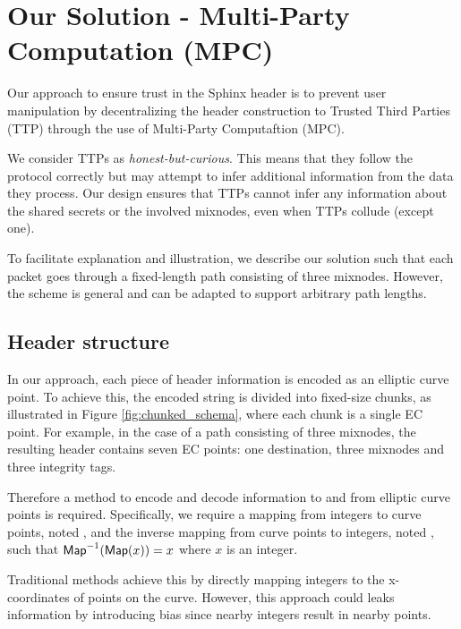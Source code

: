 \section{Our Solution - Multi-Party Computation (MPC)}\label{sec:scheme}

Our approach to ensure trust in the Sphinx header is to prevent user manipulation by decentralizing the header construction to Trusted Third Parties (TTP) through the use of Multi-Party Computaftion (MPC).
\newline

We consider TTPs as \textit{honest-but-curious}.
This means that they follow the protocol correctly but may attempt to infer additional information from the data they process.
Our design ensures that TTPs cannot infer any information about the shared secrets  or the involved mixnodes, even when TTPs collude (except one).
\newline

To facilitate explanation and illustration, we describe our solution such that each packet goes through a fixed-length path consisting of three mixnodes.
However, the scheme is general and can be adapted to support arbitrary path lengths. 


\subsection{Header structure}

In our approach, each piece of header information is encoded as an elliptic curve point. 
To achieve this, the encoded string is divided into fixed-size chunks, as illustrated in Figure \ref{fig:chunked_schema}, where each chunk is a single EC point. 
For example, in the case of a path consisting of three mixnodes, the resulting header contains seven EC points: one destination, three mixnodes and three integrity tags.

Therefore a method to encode and decode information to and from elliptic curve points is required. 
Specifically, we require a mapping from integers to curve points, noted \Map{}, and the inverse mapping from curve points to integers, noted \InverseMap{}, 
such that $\InverseMap{\Map{x}} = x$ where $x$ is an integer.

Traditional methods achieve this by directly mapping integers to the x-coordinates of points on the curve. 
However, this approach could leaks information by introducing bias since nearby integers result in nearby points.

